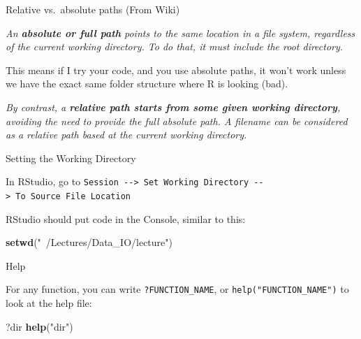 \documentclass[
  ignorenonframetext,
]{beamer}
\newenvironment{Shaded}{\begin{snugshade}}{\end{snugshade}}
\newcommand{\KeywordTok}[1]{\textcolor[rgb]{0.13,0.29,0.53}{\textbf{#1}}}
\newcommand{\NormalTok}[1]{#1}
\newcommand{\StringTok}[1]{\textcolor[rgb]{0.31,0.60,0.02}{#1}}
\begin{document}
\begin{frame}{Relative vs.~absolute paths (From Wiki)}
\protect\hypertarget{relative-vs.-absolute-paths-from-wiki}{}

\emph{An \textbf{absolute or full path} points to the same location in a
file system, regardless of the current working directory. To do that, it
must include the root directory.}

This means if I try your code, and you use absolute paths, it won't work
unless we have the exact same folder structure where R is looking (bad).

\emph{By contrast, a \textbf{relative path starts from some given
working directory}, avoiding the need to provide the full absolute path.
A filename can be considered as a relative path based at the current
working directory. }

\end{frame}

\begin{frame}[fragile]{Setting the Working Directory}
\protect\hypertarget{setting-the-working-directory}{}

In RStudio, go to
\texttt{Session\ -\/-\textgreater{}\ Set\ Working\ Directory\ -\/-\textgreater{}\ To\ Source\ File\ Location}

RStudio should put code in the Console, similar to this:

\begin{Shaded}
\begin{Highlighting}[]
\KeywordTok{setwd}\NormalTok{(}\StringTok{"~/Lectures/Data_IO/lecture"}\NormalTok{)}
\end{Highlighting}
\end{Shaded}

\end{frame}

\begin{frame}[fragile]{Help}
\protect\hypertarget{help}{}

For any function, you can write \texttt{?FUNCTION\_NAME}, or
\texttt{help("FUNCTION\_NAME")} to look at the help file:

\begin{Shaded}
\begin{Highlighting}[]
\NormalTok{?dir}
\KeywordTok{help}\NormalTok{(}\StringTok{"dir"}\NormalTok{)}
\end{Highlighting}
\end{Shaded}

\end{frame}
\end{document}
